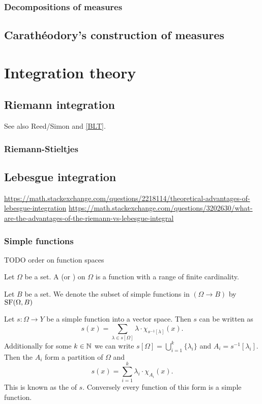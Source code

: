\subsection{Decompositions of measures}

\section{Carathéodory's construction of measures}

\chapter{Integration theory}
\section{Riemann integration}
See also Reed/Simon and \ref{BLT}.
\subsection{Riemann-Stieltjes}

\section{Lebesgue integration}
\url{https://math.stackexchange.com/questions/2218114/theoretical-advantages-of-lebesgue-integration}
\url{https://math.stackexchange.com/questions/3202630/what-are-the-advantages-of-the-riemann-vs-lebesgue-integral}
\subsection{Simple functions}
TODO order on function spaces

\begin{definition}
Let $\Omega$ be a set. A  (or ) on $\Omega$ is a function with a range of finite cardinality.

Let $B$ be a set. We denote the subset of simple functions in $(\Omega\to B)$ by $\operatorname{SF}(\Omega,B)$
\end{definition}

\begin{lemma}
Let $s:\Omega\to Y$ be a simple function into a vector space. Then $s$ can be written as
\[ s(x) = \sum_{\lambda \in s[\Omega]}\lambda\cdot \chi_{s^{-1}[\lambda]}(x). \]
Additionally for some $k\in\mathbb{N}$ we can write $s[\Omega] = \bigcup_{i=1}^k\{\lambda_i\}$ and $A_i = s^{-1}[\lambda_i]$. Then the $A_i$ form a partition of $\Omega$ and
\[ s(x) = \sum_{i=1}^k\lambda_i\cdot \chi_{A_i}(x). \]
This is known as the  of $s$. Conversely every function of this form is a simple function.
\end{lemma}

